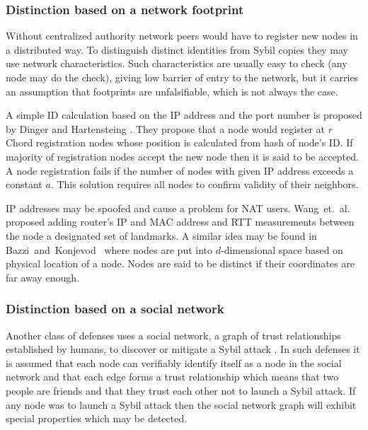   \subsubsection{Distinction based on a network footprint}

  Without centralized authority network peers would have to register new nodes
  in a distributed way. To distinguish distinct identities from Sybil copies
  they may use network characteristics.
  Such characteristics are usually easy to check (any node may do the check),
  giving low barrier of entry to the network, but it carries an
  assumption that footprints are unfalsifiable, which is not always the case.

  A simple ID calculation based on the IP address and the port number is
  proposed by Dinger and Hartensteing \cite{din06}.
  They propose that a node would register at $r$ Chord registration nodes whose
  position is calculated from hash of node's ID.
  If majority of registration nodes accept the new node then
  it is said to be accepted.
  A node registration fails if the number of nodes with given IP address exceeds
  a constant $a$.
  This solution requires all nodes to confirm validity of their neighbors.

  IP addresses may be spoofed and cause a problem for NAT users.
  Wang~et.~al.~\cite{wan05} proposed adding router's IP and MAC address
  and RTT measurements between the node a designated set of landmarks. A similar
  idea may be found in Bazzi~and~Konjevod~\cite{baz05} where nodes are put
  into $d$-dimensional space based on physical location of a node. Nodes are
  said to be distinct if their coordinates are far away enough.

  \subsubsection{Distinction based on a social network}

  Another class of defenses uses a social network, a graph of trust
  relationships established by humans, to discover or mitigate a Sybil attack
  \cite{urd11}.
  In such defenses it is assumed that each node can verifiably identify itself
  as a node in the social network and that each edge forms a trust relationship
  which means that two people are friends and that they trust each other not to
  launch a Sybil attack. If any node was to launch a Sybil attack then the
  social network graph will exhibit special properties which may be detected. 

